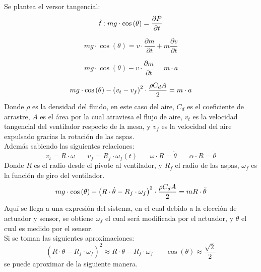 Se plantea el versor tangencial:
\begin{equation}
    \hat{t}: \\ mg\cdot \cos{(\theta)}=\frac{\partial P}{\partial t}
         \end{equation}
     
     \begin{equation}
    mg\cdot \cos{(\theta)}=v\cdot \frac{\partial m}{\partial t} + m \frac{\partial v}{\partial t}
         \end{equation}
     
     \begin{equation}
     mg\cdot \cos{(\theta)}-v\cdot \frac{\partial m}{\partial t} = m\cdot a
     \end{equation}
     
     \begin{equation}
     mg\cdot \cos{(\theta)}-\left( v_t - v_f\right)^2 \cdot \frac{\rho C_d A}{2}=m\cdot a\\
\end{equation}
Donde $\rho$ es la densidad del fluido, en este caso del aire, $C_d$ es el coeficiente de arrastre, $A$ es el área por la cual atraviesa el flujo de aire, $v_t$ es la velocidad tangencial del ventilador respecto de la mesa, y $v_f$ es la velocidad del aire expulsado gracias la rotación de las aspas.\\
Además sabiendo las siguientes relaciones:
\begin{equation}
    v_t=R\cdot \omega \ \ \ \ \ \ \ \ v_f = R_f\cdot \omega_f(t) \ \ \ \ \ \ \ \ \omega \cdot R = \dot{\theta} \ \ \ \ \ \ \ \  \alpha\cdot R = \ddot{\theta}
\end{equation}
Donde $R$ es el radio desde el pivote al ventilador, y $R_f$ el radio de las aspas, $\omega_f$ es la función de giro del ventilador.
\begin{equation}
     mg\cdot \cos{(\theta)}-\left( R\cdot \dot{\theta} - R_f \cdot \omega_f\right)^2 \cdot \frac{\rho C_d A}{2}=mR\cdot \ddot{\theta}\\
\end{equation}
Aquí se llega a una expresión del sistema, en el cual debido a la elección de actuador y sensor, se obtiene $\omega_f$ el cual será modificada por el actuador, y $\theta$ el cual es medido por el sensor.\\
Si se toman las siguientes aproximaciones:
\begin{equation} 
\left( R\cdot \dot{\theta} - R_f\cdot \omega_f \right)^2 \approx R\cdot \dot{\theta} - R_f\cdot \omega_f \ \ \ \ \ \ \ \ \cos{(\theta)}\approx \frac{\sqrt{2}}{2}
\end{equation}
se puede aproximar de la siguiente manera.

